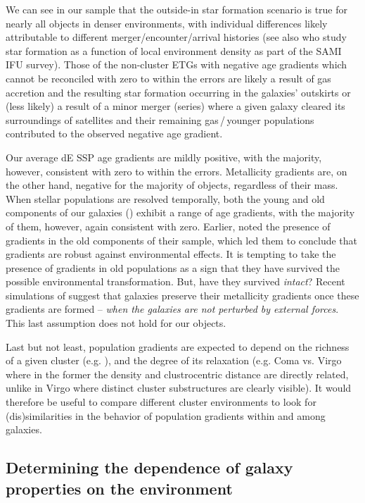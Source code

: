 \documentclass[useAMS,usenatbib]{mn2e}
\begin{document}
We can see in our sample that the outside-in star formation scenario is true for nearly all objects in denser environments, with individual differences likely attributable to different merger/encounter/arrival histories (see also \citealt{schaefer:2017} who study star formation as a function of local environment density as part of the SAMI IFU survey). Those of the non-cluster ETGs with negative age gradients which cannot be reconciled with zero to within the errors are likely a result of gas accretion and the resulting star formation occurring in the galaxies' outskirts or (less likely) a result of a minor merger (series) where a given galaxy cleared its surroundings of satellites and their remaining gas\,/\,younger populations contributed to the observed negative age gradient.

Our average dE SSP age gradients are mildly positive, with the majority, however, consistent with zero to within the errors. Metallicity gradients are, on the other hand, negative for the majority of objects, regardless of their mass. When stellar populations are resolved temporally, both the young and old components of our galaxies (\citealt{rys:2015}) exhibit a range of age gradients, with the majority of them, however, again consistent with zero. Earlier, \cite{koleva:2011} noted the presence of gradients in the old components of their sample, which led them to conclude that gradients are robust against environmental effects. It is tempting to take the presence of gradients in old populations as a sign that they have survived the possible environmental transformation. But, have they survived \textit{intact}? Recent simulations of \cite{schroyen:2013} suggest that galaxies preserve their metallicity gradients once these gradients are formed -- \textit{when the galaxies are not perturbed by external forces}. This last assumption does not hold for our objects. 

Last but not least, population gradients are expected to depend on the richness of a given cluster (e.g. \citealt{labarbera:2005}), and the degree of its relaxation (e.g. Coma vs. Virgo where in the former the density and clustrocentric distance are directly related, unlike in Virgo where distinct cluster substructures are clearly visible). It would therefore be useful to compare different cluster environments to look for (dis)similarities in the behavior of population gradients within and among galaxies.

\subsection{Determining the dependence of galaxy properties on the environment}
\label{discussion-env}
\end{document}
